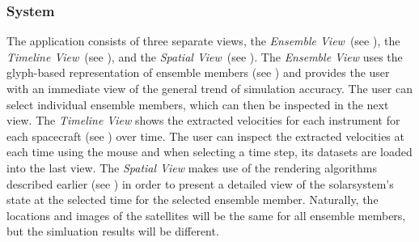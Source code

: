 \subsubsection{System} \label{contributions:astro:spaceweather:system}
The application consists of three separate views, the \emph{Ensemble View}~(see ), the \emph{Timeline View}~(see ), and the \emph{Spatial View}~(see ).  The \emph{Ensemble View} uses the glyph-based representation of ensemble members (see ) and provides the user with an immediate view of the general trend of simulation accuracy.  The user can select individual ensemble members, which can then be inspected in the next view.  The \emph{Timeline View} shows the extracted velocities for each instrument for each spacecraft (see ) over time.  The user can inspect the extracted velocities at each time using the mouse and when selecting a time step, its datasets are loaded into the last view.  The \emph{Spatial View} makes use of the rendering algorithms described earlier (see ) in order to present a detailed view of the solarsystem's state at the selected time for the selected ensemble member.  Naturally, the locations and images of the satellites will be the same for all ensemble members, but the simluation results will be different.





